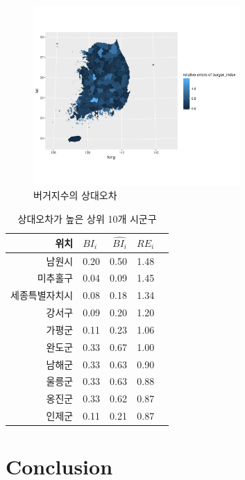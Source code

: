 \documentclass{scrartcl}
\begin{document}
\begin{figure}[!ht]
    \centering
    \includegraphics[width=0.7\textwidth]{../figs/reBI_sig.png}
    \caption{버거지수의 상대오차}\label{fig:rebi}
\end{figure}

\begin{table}[ht]
    \centering
    \begin{tabular}{rlrrr}
        \hline
        위치 & $BI_i$ & $\hat{BI_i}$ & $RE_i$ \\ 
        \hline
        남원시 & 0.20 & 0.50 & 1.48 \\ 
        미추홀구 & 0.04 & 0.09 & 1.45 \\ 
        세종특별자치시 & 0.08 & 0.18 & 1.34 \\ 
        강서구 & 0.09 & 0.20 & 1.20 \\ 
        가평군 & 0.11 & 0.23 & 1.06 \\ 
        완도군 & 0.33 & 0.67 & 1.00 \\ 
        남해군 & 0.33 & 0.63 & 0.90 \\ 
        울릉군 & 0.33 & 0.63 & 0.88 \\ 
        옹진군 & 0.33 & 0.62 & 0.87 \\ 
        인제군 & 0.11 & 0.21 & 0.87 \\ 
        \hline
      \end{tabular}
    \caption{상대오차가 높은 상위 10개 시군구}\label{tbl:rebitop5}
\end{table}

\clearpage
\section{Conclusion}\label{sec:con}
\end{document}
